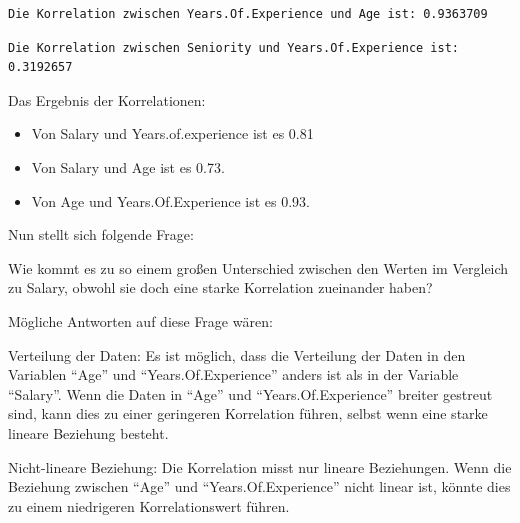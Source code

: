 \documentclass[
  letterpaper,
  DIV=11,
  numbers=noendperiod]{scrartcl}
\newenvironment{Shaded}{\begin{snugshade}}{\end{snugshade}}
\newcommand{\AttributeTok}[1]{\textcolor[rgb]{0.40,0.45,0.13}{#1}}
\newcommand{\FunctionTok}[1]{\textcolor[rgb]{0.28,0.35,0.67}{#1}}
\newcommand{\NormalTok}[1]{\textcolor[rgb]{0.00,0.23,0.31}{#1}}
\newcommand{\OtherTok}[1]{\textcolor[rgb]{0.00,0.23,0.31}{#1}}
\newcommand{\SpecialCharTok}[1]{\textcolor[rgb]{0.37,0.37,0.37}{#1}}
\newcommand{\StringTok}[1]{\textcolor[rgb]{0.13,0.47,0.30}{#1}}
\begin{document}
\begin{verbatim}
Die Korrelation zwischen Years.Of.Experience und Age ist: 0.9363709 
\end{verbatim}

\begin{Shaded}
\end{Shaded}

\begin{verbatim}
Die Korrelation zwischen Seniority und Years.Of.Experience ist: 0.3192657 
\end{verbatim}

Das Ergebnis der Korrelationen:

\begin{itemize}
\item
  Von Salary und Years.of.experience ist es 0.81
\item
  Von Salary und Age ist es 0.73.
\item
  Von Age und Years.Of.Experience ist es 0.93.
\end{itemize}

Nun stellt sich folgende Frage:

Wie kommt es zu so einem großen Unterschied zwischen den Werten im
Vergleich zu Salary, obwohl sie doch eine starke Korrelation zueinander
haben?

Mögliche Antworten auf diese Frage wären:

Verteilung der Daten: Es ist möglich, dass die Verteilung der Daten in
den Variablen ``Age'' und ``Years.Of.Experience'' anders ist als in der
Variable ``Salary''. Wenn die Daten in ``Age'' und
``Years.Of.Experience'' breiter gestreut sind, kann dies zu einer
geringeren Korrelation führen, selbst wenn eine starke lineare Beziehung
besteht.

Nicht-lineare Beziehung: Die Korrelation misst nur lineare Beziehungen.
Wenn die Beziehung zwischen ``Age'' und ``Years.Of.Experience'' nicht
linear ist, könnte dies zu einem niedrigeren Korrelationswert führen.
\end{document}
